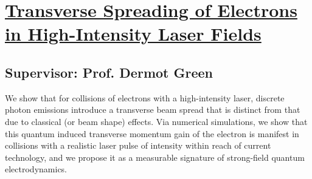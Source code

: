 \section{\href{https://doi.org/10.1103/PhysRevLett.112.164801}{Transverse Spreading of Electrons in High-Intensity Laser Fields}}

 \subsection*{Supervisor: Prof. Dermot Green}

We show that for collisions of electrons with a high-intensity laser, discrete photon emissions introduce a transverse beam spread that is distinct from that due to classical (or beam shape) effects. Via numerical simulations, we show that this quantum induced transverse momentum gain of the electron is manifest in collisions with a realistic laser pulse of intensity within reach of current technology, and we propose it as a measurable signature of strong-field quantum electrodynamics.
